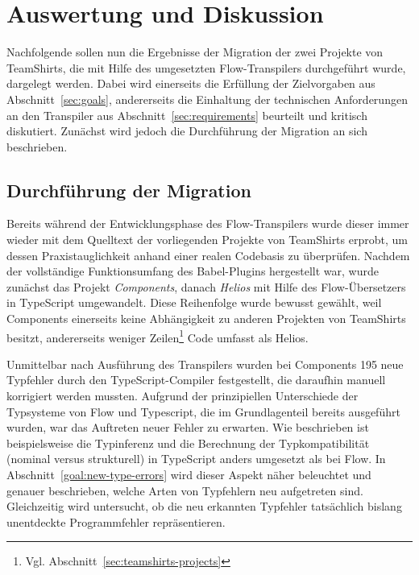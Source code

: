 \chapter{Auswertung und Diskussion}
\label{chap:evaluation}

Nachfolgende sollen nun die Ergebnisse der Migration der zwei Projekte von TeamShirts, die mit Hilfe des umgesetzten Flow-Transpilers durchgeführt wurde, dargelegt werden. Dabei wird einerseits die Erfüllung der Zielvorgaben aus Abschnitt~\ref{sec:goals}, andererseits die Einhaltung der technischen Anforderungen an den Transpiler aus Abschnitt~\ref{sec:requirements} beurteilt und kritisch diskutiert. Zunächst wird jedoch die Durchführung der Migration an sich beschrieben.

\section{Durchführung der Migration}

Bereits während der Entwicklungsphase des Flow-Transpilers wurde dieser immer wieder mit dem Quelltext der vorliegenden Projekte von TeamShirts erprobt, um dessen Praxistauglichkeit anhand einer realen Codebasis zu überprüfen. Nachdem der vollständige Funktionsumfang des Babel-Plugins hergestellt war, wurde zunächst das Projekt \textit{Components}, danach \textit{Helios} mit Hilfe des Flow-Übersetzers in TypeScript umgewandelt. Diese Reihenfolge wurde bewusst gewählt, weil Components einerseits keine Abhängigkeit zu anderen Projekten von TeamShirts besitzt, andererseits weniger Zeilen\footnote{Vgl. Abschnitt~\ref{sec:teamshirts-projects}} Code umfasst als Helios.

Unmittelbar nach Ausführung des Transpilers wurden bei Components 195 neue Typfehler durch den TypeScript-Compiler festgestellt, die daraufhin manuell korrigiert werden mussten. Aufgrund der prinzipiellen Unterschiede der Typsysteme von Flow und Typescript, die im Grundlagenteil bereits ausgeführt wurden, war das Auftreten neuer Fehler zu erwarten. Wie beschrieben ist beispielsweise die Typinferenz und die Berechnung der Typkompatibilität (nominal versus strukturell) in TypeScript anders umgesetzt als bei Flow. In Abschnitt~\ref{goal:new-type-errors} wird dieser Aspekt näher beleuchtet und genauer beschrieben, welche Arten von Typfehlern neu aufgetreten sind. Gleichzeitig wird untersucht, ob die neu erkannten Typfehler tatsächlich bislang unentdeckte Programmfehler repräsentieren.


